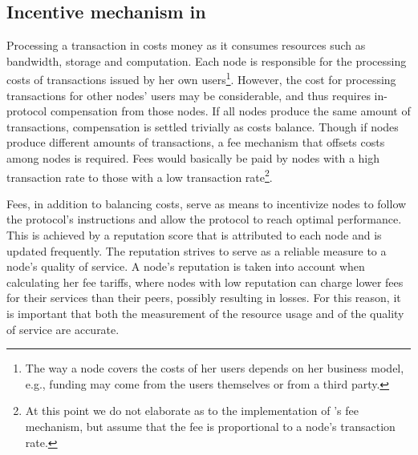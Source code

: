 


\subsection{Incentive mechanism in \nameNS}
\label{Reputation} 
Processing a transaction in \name costs money as it consumes resources such as bandwidth, storage and computation. Each node is responsible for the processing costs of transactions issued by her own users\footnote{The way a node covers the costs of her users depends on her business model, e.g., funding may come from the users themselves or from a third party.}. However, the cost for processing transactions for other nodes’ users may be considerable, and thus requires in-protocol compensation from those nodes. If all nodes produce the same amount of transactions, compensation is settled trivially as costs balance. Though if nodes produce different amounts of transactions, a fee mechanism that offsets costs among nodes is required. Fees would basically be paid by nodes with a high transaction rate to those with a low transaction rate\footnote{At this point we do not elaborate as to the implementation of \nameNS's fee mechanism, but assume that the fee is proportional to a node's transaction rate.}. 

Fees, in addition to balancing costs, serve as means to incentivize nodes to follow the protocol's instructions and allow the protocol to reach optimal performance. This is achieved by a reputation score that is attributed to each node and is updated frequently. The reputation strives to serve as a reliable measure to a node's quality of service. A node’s reputation is taken into account when calculating her fee tariffs, where nodes with low reputation can charge lower fees for their services than their peers, possibly resulting in losses. For this reason, it is important that both the measurement of the resource usage and of the quality of service are accurate. %

